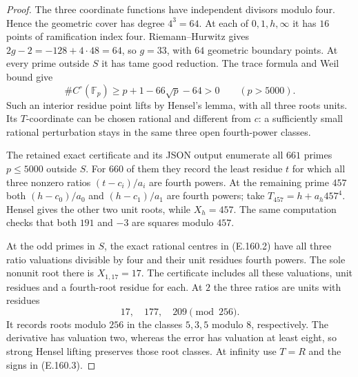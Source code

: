 \begin{proof}
The three coordinate functions have independent divisors modulo
four.  Hence the geometric cover has degree $4^3=64$.  At each of
$0,1,h,\infty$ it has $16$ points of ramification index four.
Riemann--Hurwitz gives $2g-2=-128+4\cdot48=64$, so $g=33$,
with $64$ geometric boundary points.  At every prime outside $S$
it has tame good reduction.  The trace formula and Weil bound
\citep[(1.5.1), p.~275, and Theorem (1.6), p.~276]{RootDeligne1974}
give
\[
 \#C^\circ(\mathbb F_p)\ge p+1-66\sqrt p-64>0
 \qquad(p>5000).
\tag{E.160.4}
\]
Such an interior residue point lifts by Hensel's lemma, with all
three roots units.  Its $T$-coordinate can be chosen rational and
different from $c$: a sufficiently small rational perturbation
stays in the same three open fourth-power classes.

The retained exact certificate
 and its JSON output enumerate
all $661$ primes $p\le5000$ outside $S$.  For $660$ of them they
record the least residue $t$ for which all three nonzero ratios
$(t-c_i)/a_i$ are fourth powers.  At the remaining prime $457$
both $(h-c_0)/a_0$ and $(h-c_1)/a_1$ are fourth powers; take
$T_{457}=h+a_h457^4$.  Hensel gives the other two unit roots,
while $X_h=457$.  The same computation checks that both $191$
and $-3$ are squares modulo $457$.

At the odd primes in $S$, the exact rational centres in
(E.160.2) have all three ratio valuations divisible by four and
their unit residues fourth powers.  The sole nonunit root there
is $X_{1,17}=17$.  The certificate includes all these valuations,
unit residues and a fourth-root residue for each.  At $2$ the
three ratios are units with residues
\[
 17,\quad177,\quad209\pmod {256}.
\]
It records roots modulo $256$ in the classes $5,3,5$ modulo $8$,
respectively.  The derivative has valuation two, whereas the
error has valuation at least eight, so strong Hensel lifting
preserves those root classes.  At infinity use $T=R$ and the
signs in (E.160.3).


\end{proof}
